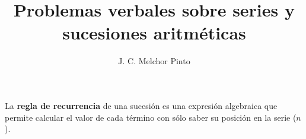 \documentclass[12pt]{guia}
\title{Problemas verbales sobre series y sucesiones aritméticas}
\author{J. C. Melchor Pinto}
\begin{document}
\pagestyle{headandfoot}
\addpoints
\INFO
\printanswers
\vspace{-2em}
\begin{multicols}{2}
    
    
    
    \columnbreak
    
    
\end{multicols}
\begin{importantbox}
    La \textbf{regla de recurrencia} de una sucesión es una expresión algebraica que permite calcular el valor de cada término con sólo saber su posición en la serie ($n$).
\end{importantbox}
\begin{questions}
    \questionboxed[10]{}
    \questionboxed[10]{}
    \questionboxed[10]{}
    \questionboxed[10]{}
    \questionboxed[10]{}
    \questionboxed[10]{}
    \questionboxed[10]{}
    \questionboxed[10]{}
    \questionboxed[10]{}
    \questionboxed[10]{}
\end{questions}
\end{document}
